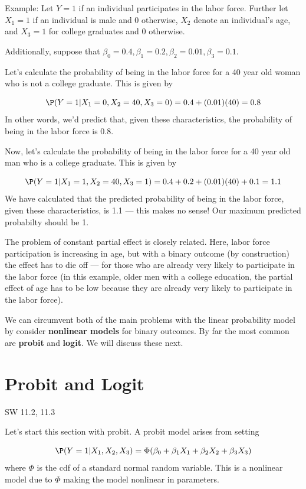 \documentclass[
  letterpaper,
  DIV=11,
  numbers=noendperiod]{scrreprt}
\begin{document}
{Example: }Let \(Y=1\) if an individual participates in the labor force.
Further let \(X_1=1\) if an individual is male and 0 otherwise, \(X_2\)
denote an individual's age, and \(X_3=1\) for college graduates and 0
otherwise.

Additionally, suppose that
\(\beta_0=0.4, \beta_1=0.2, \beta_2=0.01, \beta_3=0.1\).

Let's calculate the probability of being in the labor force for a 40
year old woman who is not a college graduate. This is given by

\[
  \P(Y=1 | X_1=0, X_2=40, X_3=0) = 0.4 + (0.01)(40) = 0.8
\] In other words, we'd predict that, given these characteristics, the
probability of being in the labor force is 0.8.

Now, let's calculate the probability of being in the labor force for a
40 year old man who is a college graduate. This is given by

\[
  \P(Y=1|X_1=1, X_2=40, X_3=1) = 0.4 + 0.2 + (0.01)(40) + 0.1 = 1.1
\] We have calculated that the predicted probability of being in the
labor force, given these characteristics, is 1.1 --- this makes no
sense! Our maximum predicted probabilty should be 1.

The problem of constant partial effect is closely related. Here, labor
force participation is increasing in age, but with a binary outcome (by
construction) the effect has to die off --- for those who are already
very likely to participate in the labor force (in this example, older
men with a college education, the partial effect of age has to be low
because they are already very likely to participate in the labor force).

We can circumvent both of the main problems with the linear probability
model by consider \textbf{nonlinear models} for binary outcomes. By far
the most common are \textbf{probit} and \textbf{logit}. We will discuss
these next.

\section{Probit and Logit}\label{probit-and-logit}

SW 11.2, 11.3

Let's start this section with probit. A probit model arises from setting

\[
  \P(Y=1|X_1,X_2,X_3) = \Phi(\beta_0 + \beta_1 X_1 + \beta_2 X_2 + \beta_3 X_3)
\] where \(\Phi\) is the cdf of a standard normal random variable. This
is a nonlinear model due to \(\Phi\) making the model nonlinear in
parameters.
\end{document}
